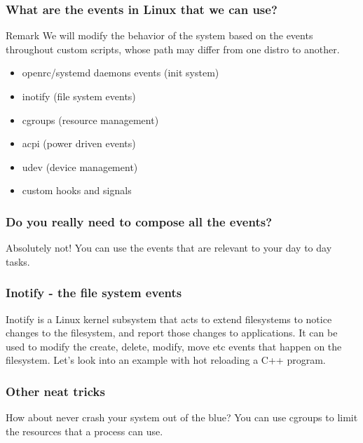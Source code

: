 \documentclass{beamer}
\begin{document}
\begin{frame}
\frametitle{What are the events in Linux that we can use?}
    \small
    \begin{block}{Remark}
        We will modify the behavior of the system based on the events throughout
        custom scripts, whose path may differ from one distro to another.
    \end{block}
    \begin{itemize}
        \item openrc/systemd daemons events (init system)
        \item inotify (file system events)
        \item cgroups (resource management)
        \item acpi (power driven events)
        \item udev (device management)
        \item custom hooks and signals
    \end{itemize}
\end{frame}

\begin{frame}
    \frametitle{Do you really need to compose all the events?}
    \small
    Absolutely not! \newline
    You can use the events that are relevant to your day to day tasks. \newline
\end{frame}

\begin{frame}
    \frametitle{Inotify - the file system events}
    \small
    Inotify is a Linux kernel subsystem that acts to extend filesystems to
    notice changes to the filesystem, and report those changes to
    applications. \newline
    \newline
    It can be used to modify the create, delete, modify, move etc events
    that happen on the filesystem. \newline
    \newline
    Let's look into an example with hot reloading a C++ program.
\end{frame}

\begin{frame}
    \frametitle{Other neat tricks}
    \small
    How about never crash your system out of the blue? \newline
    \newline
    You can use cgroups to limit the resources that a process can use. \newline
\end{frame}
\end{document}
